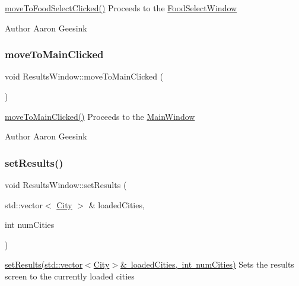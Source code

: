 \mbox{\hyperlink{class_results_window_a7a545927d8dd85526646a5d05d758052}{move\+To\+Food\+Select\+Clicked()}} Proceeds to the \mbox{\hyperlink{class_food_select_window}{Food\+Select\+Window}} 

\begin{DoxyAuthor}{Author}
Aaron Geesink 
\end{DoxyAuthor}
\mbox{\label{class_results_window_a55bcbc29f4f178f52fc610a09ec21cb3}} 
\subsubsection{\texorpdfstring{moveToMainClicked}{moveToMainClicked}}
{\footnotesize\ttfamily void Results\+Window\+::move\+To\+Main\+Clicked (\begin{DoxyParamCaption}{ }\end{DoxyParamCaption})\hspace{0.3cm}{\ttfamily [signal]}}



\mbox{\hyperlink{class_results_window_a55bcbc29f4f178f52fc610a09ec21cb3}{move\+To\+Main\+Clicked()}} Proceeds to the \mbox{\hyperlink{class_main_window}{Main\+Window}} 

\begin{DoxyAuthor}{Author}
Aaron Geesink 
\end{DoxyAuthor}
\mbox{\label{class_results_window_ab8b52e8d3719ffe9dc789ab9a4507906}} 
\subsubsection{\texorpdfstring{setResults()}{setResults()}}
{\footnotesize\ttfamily void Results\+Window\+::set\+Results (\begin{DoxyParamCaption}\item[{std\+::vector$<$ \mbox{\hyperlink{class_city}{City}} $>$ \&}]{loaded\+Cities,  }\item[{int}]{num\+Cities }\end{DoxyParamCaption})}



\mbox{\hyperlink{class_results_window_ab8b52e8d3719ffe9dc789ab9a4507906}{set\+Results(std\+::vector$<$\+City$>$\& loaded\+Cities, int num\+Cities)}} Sets the results screen to the currently loaded cities 

